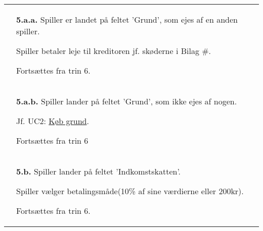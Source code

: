 \documentclass[class=article, crop=false]{standalone}
\begin{document}
\begin{table}[H]
\begin{tabularx}{\textwidth}{|l|X|}
                              & \textbf{5.a.a.} Spiller er landet på feltet
                                'Grund', som ejes af en anden spiller.
                                \begin{enumerate} \begin{tabenum}
                                  \item Spiller betaler leje til kreditoren
                                        jf. skøderne i Bilag \#.
                                  \item Fortsættes fra trin 6.
                                \end{tabenum} \end{enumerate}
                                \\
                            & \textbf{5.a.b.} Spiller lander på feltet
                                'Grund', som ikke ejes af nogen.
                            \begin{enumerate} \begin{tabenum}
                                  \item Jf. UC2: \underline{Køb grund}.
                                  \item Fortsættes fra trin 6
                            \end{tabenum} \end{enumerate}
                            \\

                            & \textbf{5.b.} Spiller lander på feltet
                            'Indkomstskatten'.
                            \begin{enumerate} \begin{tabenum}
                                                  \item Spiller vælger betalingsmåde(10\% af sine værdierne eller 200kr).
                                                  \item Fortsættes fra trin 6.
                            \end{tabenum} \end{enumerate}
                            \\


            \hline
        \end{tabularx}


    \end{table}
\end{document}
